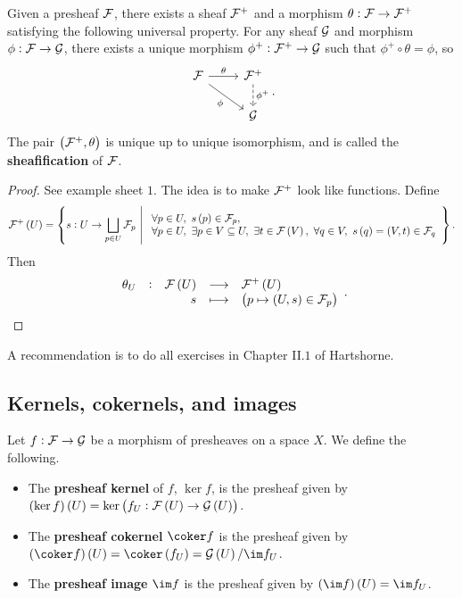 \begin{theorem}[Sheafification]
Given a presheaf $ \mathcal{F} $, there exists a sheaf $ \mathcal{F}^+ $ and a morphism $ \theta : \mathcal{F} \to \mathcal{F}^+ $ satisfying the following universal property. For any sheaf $ \mathcal{G} $ and morphism $ \phi : \mathcal{F} \to \mathcal{G} $, there exists a unique morphism $ \phi^+ : \mathcal{F}^+ \to \mathcal{G} $ such that $ \phi^+ \circ \theta = \phi $, so
$$
\begin{tikzcd}
\FFF \arrow{r}{\theta} \arrow{dr}[swap]{\phi} & \FFF^+ \arrow[dashed]{d}{\phi^+} \\
& \GGG
\end{tikzcd}.
$$
The pair $ \br{\FFF^+, \theta} $ is unique up to unique isomorphism, and is called the \textbf{sheafification} of $ \mathcal{F} $.
\end{theorem}

\begin{proof}
See example sheet $ 1 $. The idea is to make $ \mathcal{F}^+ $ look like functions. Define
$$ \FFF^+\br{U} = \cbr{s : U \to \bigsqcup_{p \in U} \FFF_p \st \begin{array}{l} \forall p \in U, \ s\br{p} \in \FFF_p, \\ \forall p \in U, \ \exists p \in V \subseteq U, \ \exists t \in \FFF\br{V}, \ \forall q \in V, \ s\br{q} = \br{V, t} \in \FFF_q \end{array}}. $$
Then
$$ \function[\theta_U]{\FFF\br{U}}{\FFF^+\br{U}}{s}{\br{p \mapsto \br{U, s} \in \FFF_p}}. $$
\end{proof}

\begin{exercise*}
A recommendation is to do all exercises in Chapter II.$ 1 $ of Hartshorne.
\end{exercise*}

\pagebreak

\subsection{Kernels, cokernels, and images}


\begin{definition*}
Let $ f : \mathcal{F} \to \mathcal{G} $ be a morphism of presheaves on a space $ X $. We define the following.
\begin{itemize}
\item The \textbf{presheaf kernel} of $ f $, $ \ker f $, is the presheaf given by $ \br{\ker f}\br{U} = \ker \br{f_U : \FFF\br{U} \to \GGG\br{U}} $.
\item The \textbf{presheaf cokernel} $ \coker f $ is the presheaf given by $ \br{\coker f}\br{U} = \coker \br{f_U} = \GGG\br{U} / \im f_U $.
\item The \textbf{presheaf image} $ \im f $ is the presheaf given by $ \br{\im f}\br{U} = \im f_U $.
\end{itemize}
\end{definition*}

